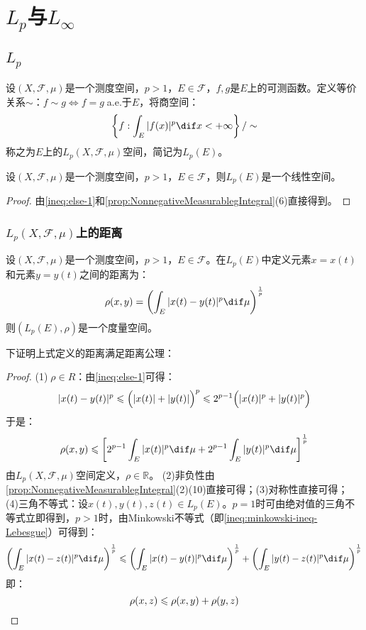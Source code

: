 \section{$L_p$与$L_{\infty}$}

\subsection{$L_p$}
\begin{definition}
	设$(X,\mathscr{F},\mu)$是一个测度空间，$p>1$，$E\in\mathscr{F}$，$f,g$是$E$上的可测函数。定义等价关系$\sim$：$f\sim g\Leftrightarrow f=g\;$a.e.于$E$，将商空间：
	\begin{equation*}
		\left\{f:\int_{E}^{}|f(x)|^p\dif x<+\infty\right\}/\sim
	\end{equation*}
	称之为$E$上的$L_p(X,\mathscr{F},\mu)$空间，简记为$L_p(E)$。
\end{definition}
\begin{property}
	设$(X,\mathscr{F},\mu)$是一个测度空间，$p>1$，$E\in\mathscr{F}$，则$L_p(E)$是一个线性空间。
\end{property}
\begin{proof}
	由\cref{ineq:else-1}和\cref{prop:NonnegativeMeasurablegIntegral}(6)直接得到。
\end{proof}
\subsubsection{$L_p(X,\mathscr{F},\mu)$上的距离}
\begin{definition}
	设$(X,\mathscr{F},\mu)$是一个测度空间，$p>1$，$E\in\mathscr{F}$。在$L_p(E)$中定义元素$x=x(t)$和元素$y=y(t)$之间的距离为：
	\begin{equation*}
		\rho(x,y)=\left(\int_{E}^{}|x(t)-y(t)|^p\dif\mu\right)^\frac{1}{p}
	\end{equation*}
	则$(L_p(E),\rho)$是一个度量空间。
\end{definition}
下证明上式定义的距离满足距离公理：
\begin{proof}
	(1)$\;\rho\in R$：由\cref{ineq:else-1}可得：
	\begin{equation*}
		|x(t)-y(t)|^p\leqslant\Bigl(|x(t)|+|y(t)|\Bigr)^p\leqslant2^{p-1}\Bigl(|x(t)|^p+|y(t)|^p\Bigr)
	\end{equation*}
	于是：
	\begin{equation*}
		\rho(x,y)\leqslant\left[2^{p-1}\int_{E}^{}|x(t)|^p\dif\mu+2^{p-1}\int_{E}^{}|y(t)|^p\dif\mu\right]^{\frac{1}{p}}
	\end{equation*}
	由$L_p(X,\mathscr{F},\mu)$空间定义，$\rho\in\mathbb{R}$。
	(2)非负性由\cref{prop:NonnegativeMeasurablegIntegral}(2)(10)直接可得；(3)对称性直接可得；
	(4)三角不等式：设$x(t),y(t),z(t)\in L_p(E)$。$p=1$时可由绝对值的三角不等式立即得到，$p>1$时，由Minkowski不等式（即\cref{ineq:minkowski-ineq-Lebesgue}）可得到：
	\begin{equation*}
		\left(\int_{E}|x(t)-z(t)|^p\dif\mu\right)^{\frac{1}{p}} \leqslant \left(\int_{E}|x(t)-y(t)|^p\dif\mu\right)^{\frac{1}{p}} + \left(\int_{E}|y(t)-z(t)|^p\dif\mu\right)^{\frac{1}{p}}
	\end{equation*}
	即：
	\begin{equation*}
		\rho(x,z)\leqslant\rho(x,y)+\rho(y,z)\qedhere
	\end{equation*}
\end{proof}
